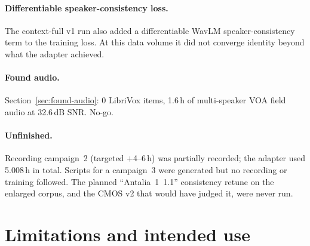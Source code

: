 \documentclass[10pt,twocolumn]{article}
\newcommand{\antalia}{Antalia~1}
\begin{document}
\paragraph{Differentiable speaker-consistency loss.} The context-full v1 run also added a differentiable WavLM speaker-consistency term to the training loss. At this data volume it did not converge identity beyond what the adapter achieved.

\paragraph{Found audio.} Section~\ref{sec:found-audio}: 0 LibriVox items, 1.6\,h of multi-speaker VOA field audio at 32.6\,dB SNR. No-go.

\paragraph{Unfinished.} Recording campaign~2 (targeted $+$4--6\,h) was partially recorded; the adapter used 5.008\,h in total. Scripts for a campaign~3 were generated but no recording or training followed. The planned ``\antalia~1.1'' consistency retune on the enlarged corpus, and the CMOS v2 that would have judged it, were never run.

\section{Limitations and intended use}
\label{sec:limitations}
\end{document}
